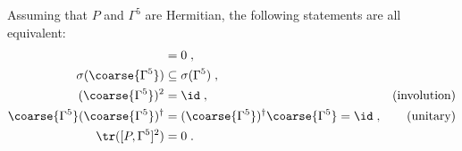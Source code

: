 \begin{lemma} \label{lemma:chirality:preservation:equiv}
Assuming that $P$ and $\Gamma^{5}$ are Hermitian, the following statements are all equivalent:
\begin{align}
[P, \Gamma^{5}] &= 0 \;, \label{eq:lemma:chirality:preservation:equiv} \\
\sigma(\coarse{\Gamma^{5}}) &\subseteq \sigma(\Gamma^{5}) \;, \label{eq:lemma:sigma} \\
(\coarse{\Gamma^{5}})^{2} &= \id \;, &\text{(involution)} \label{eq:lemma:involution} \\
\coarse{\Gamma^{5}} (\coarse{\Gamma^{5}})^{\dagger} &= (\coarse{\Gamma^{5}})^{\dagger} \coarse{\Gamma^{5}} = \id \;, &\text{(unitary)} \label{eq:lemma:unitary} \\
\tr([P, \Gamma^{5}]^{2}) &= 0 \label{eq:lemma:trsq0} \;.
\end{align}
\end{lemma}
